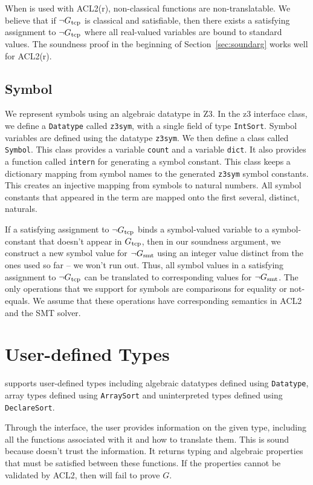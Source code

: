 When \smtlink{} is used with ACL2(r), non-classical functions are
non-translatable. We believe that if $\neg G_{\mathrm{tcp}}$ is classical and satisfiable,
then there exists a satisfying assignment to $\neg G_{\mathrm{tcp}}$ where all real-valued
variables are bound to standard values. The soundness proof in the beginning of
Section~\ref{sec:soundarg} works well for ACL2(r).

\subsection{Symbol}\label{subsec:symbols}
We represent symbols using an algebraic datatype in Z3. In the z3 interface
class, we define a \texttt{Datatype} called \texttt{z3sym}, with a single field
of type \texttt{IntSort}. Symbol variables are defined using the datatype
\texttt{z3sym}. We then define a class called \texttt{Symbol}. This class
provides a variable \texttt{count} and a variable \texttt{dict}. It also
provides a function called \texttt{intern} for generating a symbol constant.
This class keeps a dictionary mapping from symbol names to the generated
\texttt{z3sym} symbol constants. This creates an injective mapping from symbols
to natural numbers.
All symbol constants that appeared in the term are mapped onto the first
several, distinct, naturals.

If a satisfying assignment to $\neg G_{\mathrm{tcp}}$ binds a symbol-valued variable
to a symbol-constant that doesn't appear in $G_{\mathrm{tcp}}$, then in our soundness
argument, we construct a new symbol value for $\neg G_{\mathrm{smt}}$ using an integer
value distinct from the ones used so far -- we won't run out.
Thus, all symbol values in a satisfying assignment to $\neg G_{\mathrm{tcp}}$
can be translated to corresponding values for $\neg G_{\mathrm{smt}}$.
The only operations that we support for symbols are comparisons for equality or
not-equals.  We assume that these operations have corresponding semantics in
ACL2 and the \acs{SMT} solver.

\section{User-defined Types}\label{sec:sounduserdefined}
\smtlink{} supports user-defined types including algebraic datatypes defined
using \texttt{Datatype}, array types defined using \texttt{ArraySort} and
uninterpreted types defined using \texttt{DeclareSort}.

Through the \smtlink{} interface, the user provides information on the given
type, including all the functions associated with it and how to translate them.
This is sound because \smtlink{} doesn't trust the information. It returns
typing and algebraic properties that must be satisfied between these functions.
If the properties cannot be validated by ACL2, then \smtlink{} will fail to
prove $G$.

